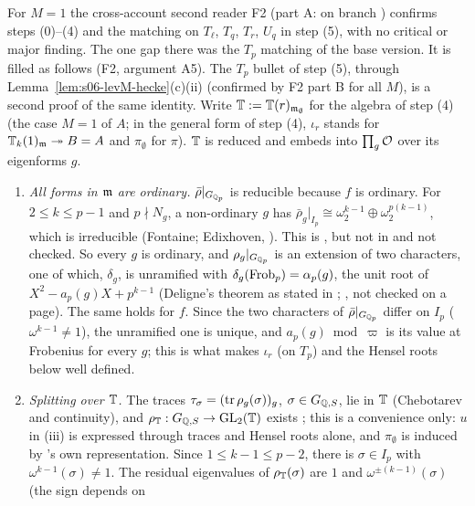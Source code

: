 \begin{remark}[$M=1$: the $T_p$ matching, minor corrections, status after the second reading]\label{rem:s06-levM-M1}
For $M=1$ the cross-account second reader F2 (part A:  on branch
) confirms steps (0)--(4) and the matching on $T_\ell$, $T_q$, $T_r$, $U_q$ in step (5), with no critical or major
finding. The one gap there was the $T_p$ matching of the base version. It is filled as follows (F2, argument A5). The $T_p$ bullet of step
(5), through Lemma~\ref{lem:s06-levM-hecke}(c)(ii) (confirmed by F2 part B for all $M$), is a second proof of the same identity. Write $\mathbb{T}:=\mathbb{T}(r)_{\mathfrak{m}_\emptyset}$ for the algebra of
step (4) (the case $M=1$ of $A$; in the general form of step (4), $\iota_r$ stands for $\mathbb{T}_k(1)_{\mathfrak{m}}\twoheadrightarrow B=A$ and $\pi_\emptyset$ for $\pi$). $\mathbb{T}$ is reduced \cite[Thm~2.9, Thm~3.14]{KO} and embeds into $\prod_g\mathcal{O}$ over its eigenforms $g$.
\begin{enumerate}[label=(\roman*)]
\item \emph{All forms in $\mathfrak{m}$ are ordinary.} $\bar\rho|_{G_{\mathbb{Q}_p}}$ is reducible because $f$ is ordinary. For $2\le k\le p-1$ and
  $p\nmid N_g$, a non-ordinary $g$ has $\bar\rho_g|_{I_p}\cong\omega_2^{k-1}\oplus\omega_2^{p(k-1)}$, which is irreducible (Fontaine; Edixhoven,
  \cite[Thm~2.6]{Edi92}). This is \stcited{}, but not in  and not
  checked. So every $g$ is ordinary, and $\rho_g|_{G_{\mathbb{Q}_p}}$ is an extension of two characters, one of which, $\delta_g$, is unramified
  with $\delta_g(\mathrm{Frob}_p)=\alpha_p(g)$, the unit root of $X^2-a_p(g)X+p^{k-1}$ (Deligne's theorem as stated in \cite[Thm~2.5]{Edi92};
  \stcited, not checked on a page). The same holds for $f$. Since the two characters of $\bar\rho|_{G_{\mathbb{Q}_p}}$ differ on $I_p$
  ($\omega^{k-1}\ne1$), the unramified one is unique, and $a_p(g)\bmod\varpi$ is its value at Frobenius for every $g$; this is what makes
  $\iota_r$ (on $T_p$) and the Hensel roots below well defined.
\item \emph{Splitting over $\mathbb{T}$.} The traces $\tau_\sigma=(\operatorname{tr}\rho_g(\sigma))_g$, $\sigma\in G_{\mathbb{Q},S}$, lie in $\mathbb{T}$ (Chebotarev and continuity),
  and $\rho_{\mathbb{T}}:G_{\mathbb{Q},S}\to\mathrm{GL}_2(\mathbb{T})$ exists \cite[Th\'eor\`eme~2, p.~219]{Car94}; this is a convenience only: $u$ in (iii) is
  expressed through traces and Hensel roots alone, and $\pi_\emptyset$ is induced by \cite{KO}'s own representation. Since $1\le k-1\le p-2$, there is $\sigma\in I_p$ with
  $\omega^{k-1}(\sigma)\ne1$. The residual eigenvalues of $\rho_{\mathbb{T}}(\sigma)$ are $1$ and $\omega^{\pm(k-1)}(\sigma)$ (the sign depends on

\end{enumerate}
\end{remark}

